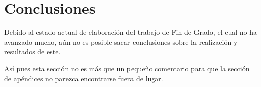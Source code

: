 \chapter{Conclusiones}
Debido al estado actual de elaboración del trabajo de Fin de Grado, el cual no ha avanzado mucho, aún no es posible sacar conclusiones sobre la realización y resultados de este.

Así pues esta sección no es más que un pequeño comentario para que la sección de apéndices no parezca encontrarse fuera de lugar.
